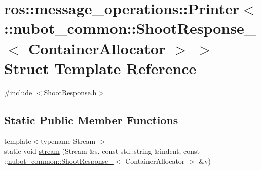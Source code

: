 \hypertarget{structros_1_1message__operations_1_1Printer_3_01_1_1nubot__common_1_1ShootResponse___3_01ContainerAllocator_01_4_01_4}{\section{ros\-:\-:message\-\_\-operations\-:\-:Printer$<$ \-:\-:nubot\-\_\-common\-:\-:Shoot\-Response\-\_\-$<$ Container\-Allocator $>$ $>$ Struct Template Reference}
\label{structros_1_1message__operations_1_1Printer_3_01_1_1nubot__common_1_1ShootResponse___3_01ContainerAllocator_01_4_01_4}
}


{\ttfamily \#include $<$Shoot\-Response.\-h$>$}

\subsection*{Static Public Member Functions}
\begin{DoxyCompactItemize}
\item 
{\footnotesize template$<$typename Stream $>$ }\\static void \hyperlink{structros_1_1message__operations_1_1Printer_3_01_1_1nubot__common_1_1ShootResponse___3_01ContainerAllocator_01_4_01_4_a2a7756c15e6a8689f0d91a24799b8f06}{stream} (Stream \&s, const std\-::string \&indent, const \-::\hyperlink{structnubot__common_1_1ShootResponse__}{nubot\-\_\-common\-::\-Shoot\-Response\-\_\-}$<$ Container\-Allocator $>$ \&v)
\end{DoxyCompactItemize}


